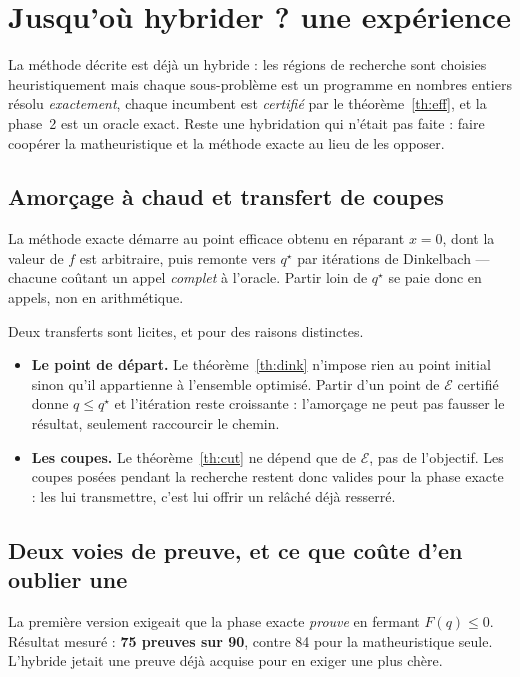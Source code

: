 \documentclass[11pt,a4paper]{article}
\theoremstyle{plain}
\theoremstyle{remark}
\newcommand{\Ecal}{\mathcal{E}}
\newcommand{\qs}{q^{\star}}
\begin{document}
\section{Jusqu'où hybrider ? une expérience}
\label{sec:hybride}

La méthode décrite est déjà un hybride : les régions de recherche sont
choisies heuristiquement mais chaque sous-problème est un programme en
nombres entiers résolu \emph{exactement}, chaque incumbent est \emph{certifié}
par le théorème~\ref{th:eff}, et la phase~2 est un oracle exact. Reste une
hybridation qui n'était pas faite : faire coopérer la matheuristique et la
méthode exacte au lieu de les opposer.

\subsection{Amorçage à chaud et transfert de coupes}

La méthode exacte démarre au point efficace obtenu en réparant $x=0$, dont la
valeur de $f$ est arbitraire, puis remonte vers $\qs$ par itérations de
Dinkelbach --- chacune coûtant un appel \emph{complet} à l'oracle. Partir
loin de $\qs$ se paie donc en appels, non en arithmétique.

Deux transferts sont licites, et pour des raisons distinctes.

\begin{itemize}[leftmargin=*,itemsep=2pt]
\item \textbf{Le point de départ.} Le théorème~\ref{th:dink} n'impose rien
      au point initial sinon qu'il appartienne à l'ensemble optimisé. Partir
      d'un point de $\Ecal$ certifié donne $q\le\qs$ et l'itération reste
      croissante : l'amorçage ne peut pas fausser le résultat, seulement
      raccourcir le chemin.
\item \textbf{Les coupes.} Le théorème~\ref{th:cut} ne dépend que de
      $\Ecal$, pas de l'objectif. Les coupes posées pendant la recherche
      restent donc valides pour la phase exacte : les lui transmettre, c'est
      lui offrir un relâché déjà resserré.
\end{itemize}

\subsection{Deux voies de preuve, et ce que coûte d'en oublier une}

La première version exigeait que la phase exacte \emph{prouve} en fermant
$F(q)\le 0$. Résultat mesuré : \textbf{75 preuves sur 90}, contre 84 pour la
matheuristique seule. L'hybride jetait une preuve déjà acquise pour en exiger
une plus chère.
\end{document}
